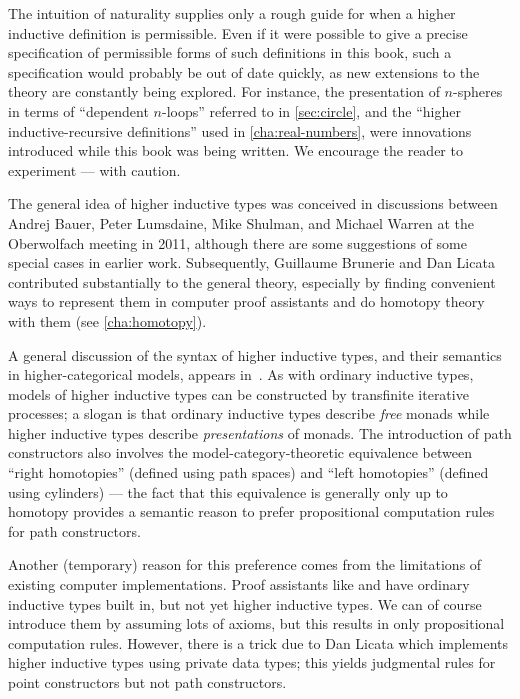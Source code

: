 The intuition of naturality supplies only a rough guide for when a higher inductive definition is permissible.
Even if it were possible to give a precise specification of permissible forms of such definitions in this book, such a specification would probably be out of date quickly, as new extensions to the theory are constantly being explored.
For instance, the presentation of $n$-spheres in terms of ``dependent $n$-loops'' referred to in \cref{sec:circle}, and the ``higher inductive-recursive definitions'' used in \cref{cha:real-numbers}, were innovations introduced while this book was being written.
We encourage the reader to experiment --- with caution.


\sectionNotes

The general idea of higher inductive types was conceived in discussions between Andrej Bauer, Peter Lumsdaine, Mike Shulman, and Michael Warren at the Oberwolfach meeting in 2011, although there are some suggestions of some special cases in earlier work.  Subsequently, Guillaume Brunerie and Dan Licata contributed substantially to the general theory, especially by finding convenient ways to represent them in computer proof assistants
and do homotopy theory with them (see \cref{cha:homotopy}).

A general discussion of the syntax of higher inductive types, and their semantics in higher-categorical models, appears in~\cite{ls:hits}.
As with ordinary inductive types, models of higher inductive types can be constructed by transfinite iterative processes; a slogan is that ordinary inductive types describe \emph{free} monads while higher inductive types describe \emph{presentations} of monads.
The introduction of path constructors also involves the model-category-theoretic equivalence between ``right homotopies'' (defined using path spaces) and ``left homotopies'' (defined using cylinders) --- the fact that this equivalence is generally only up to homotopy provides a semantic reason to prefer propositional computation rules for path constructors.

Another (temporary) reason for this preference comes from the limitations of existing computer implementations.
Proof assistants like \Coq and \Agda have ordinary inductive types built in, but not yet higher inductive types.
We can of course introduce them by assuming lots of axioms, but this results in only propositional computation rules.
However, there is a trick due to Dan Licata which implements higher inductive types using private data types; this yields judgmental rules for point constructors but not path constructors.

